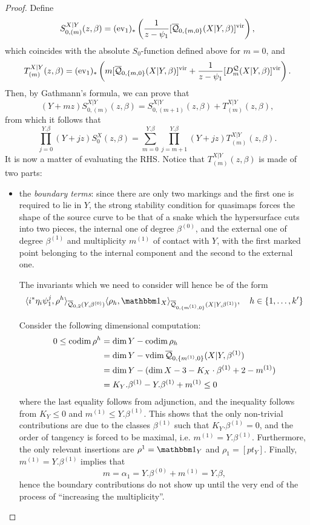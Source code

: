 \begin{proof}

Define
 \[
  S_{0,(m)}^{X|Y}(z,\beta)=(\operatorname{ev}_1)_*\left(\frac{1}{z-\psi_1}[\overline{\mathcal Q}_{0,\{m,0\}}(X|Y,\beta)]^\text{vir}\right),
 \]
which coincides with the absolute $S_0$-function defined above for $m=0$, and
\[
 T_{(m)}^{X|Y}(z,\beta)=(\operatorname{ev}_1)_*\left(m[\overline{\mathcal Q}_{0,\{m,0\}}(X|Y,\beta)]^\text{vir}+\frac{1}{z-\psi_1}[D_m^{\mathcal Q}(X|Y,\beta)]^\text{vir}\right).
\]
Then, by Gathmann's formula, we can prove that
\begin{equation}\label{eqn:G}
 (Y+mz) S_{0,(m)}^{X|Y}(z,\beta) = S_{0,(m+1)}^{X|Y}(z,\beta)+ T_{(m)}^{X|Y}(z,\beta),
\end{equation}
from which it follows that
\[
 \prod_{j=0}^{Y.\beta}(Y+jz) S_0^X(z,\beta) = \sum_{m=0}^{Y.\beta}\prod_{j=m+1}^{Y.\beta}(Y+jz)T_{(m)}^{X|Y}(z,\beta).
\]
It is now a matter of evaluating the RHS. Notice that $T_{(m)}^{X|Y}(z,\beta)$ is made of two parts:
\begin{itemize}[leftmargin=*]
 \item the \emph{boundary terms}: since there are only two markings and the first one is required to lie in $Y$, the strong stability condition for quasimaps forces the shape of the source curve to be that of a snake which the hypersurface cuts into two pieces, the internal one of degree $\beta^{(0)}$, and the external one of degree $\beta^{(1)}$ and multiplicity $m^{(1)}$ of contact with $Y$, with the first marked point belonging to the internal component and the second to the external one.
 
 The invariants which we need to consider will hence be of the form
 \[
  \langle i^*\eta_i\psi_1^j,\rho^h\rangle_{\Q{0}{2}{Y}{\beta^{(0)}}}\langle \rho_h,\mathbbm 1_{X}\rangle_{\Q{0}{\{m^{(1)},0\}}{X|Y}{\beta^{(1)}}}, \quad h\in\{1,\ldots,k'\}
 \]
 
 Consider the following dimensional computation:
\begin{align*}
 0\leq \operatorname{codim} \rho^h &= \dim Y-\operatorname{codim} \rho_h \\
 &= \dim Y-\operatorname{vdim} \overline{\mathcal Q}_{0,\{m^{(1)},0\}}(X|Y,\beta^{(1)}) \\
 &= \dim Y-(\dim X-3-K_{X}\cdot \beta^{(1)}+2-m^{(1)})\\
 &= K_Y.\beta^{(1)}-Y.\beta^{(1)}+m^{(1)}\leq 0
\end{align*}
 where the last equality follows from adjunction, and the inequality follows from $K_Y\leq 0$ and $m^{(1)}\leq Y.\beta^{(1)}$.
This shows that the only non-trivial contributions are due to the classes $\beta^{(1)}$ such that $K_Y.\beta^{(1)}=0$, and the order of tangency is forced to be maximal, i.e. $m^{(1)}=Y.\beta^{(1)}$. Furthermore, the only relevant insertions are $\rho^1=\mathbbm 1_Y$ and $\rho_1=[pt_Y]$. Finally, $m^{(1)}=Y.\beta^{(1)}$ implies that
\[
 m=\alpha_1=Y.\beta^{(0)}+m^{(1)}=Y.\beta,
\]
hence the boundary contributions do not show up until the very end of the process of ``increasing the multiplicity''.


\end{itemize}
\end{proof}
